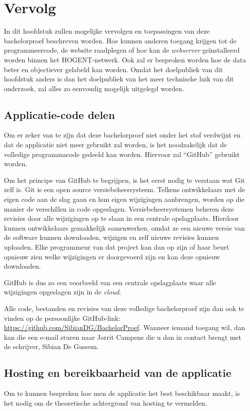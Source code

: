 \chapter{Vervolg}
\label{ch:vervolg}

In dit hoofdstuk zullen mogelijke vervolgen en toepassingen van deze bachelorproef beschreven worden. Hoe kunnen anderen toegang krijgen tot de programmeercode, de website raadplegen of hoe kan de \textit{webserver} geïnstalleerd worden binnen het HOGENT-netwerk. Ook zal er besproken worden hoe de data beter en objectiever gelabeld kan worden. Omdat het doelpubliek van dit hoofdstuk anders is dan het doelpubliek van het meer technische luik van dit onderzoek, zal alles zo eenvoudig mogelijk uitgelegd worden.

\section{Applicatie-code delen}
Om er zeker van te zijn dat deze bachelorproef niet onder het stof verdwijnt en dat de applicatie niet meer gebruikt zal worden, is het noodzakelijk dat de volledige programmacode gedeeld kan worden. Hiervoor zal ``GitHub'' gebruikt worden.

Om het principe van GitHub te begrijpen, is het eerst nodig te verstaan wat Git zelf is. Git is een open source versiebeheersysteem. Telkens ontwikkelaars met de eigen code aan de slag gaan en hun eigen wijzigingen aanbrengen, worden op die manier de verschillen in code opgeslagen. Versiebeheersystemen beheren deze revisies door alle wijzigingen op te slaan in een centrale opslagplaats. Hierdoor kunnen ontwikkelaars gemakkelijk samenwerken, omdat ze een nieuwe versie van de software kunnen downloaden, wijzigen en zelf nieuwe revisies kunnen uploaden. Elke programmeur van dat project kan dan op zijn of haar beurt opnieuw zien welke wijzigingen er doorgevoerd zijn en kan deze opnieuw downloaden.~\autocite{Brown2019}

GitHub is dus zo een voorbeeld van een centrale opslagplaats waar alle wijzigingen opgeslagen zijn in de \textit{cloud}.

Alle code, bestanden en revisies van deze volledige bachelorproef zijn dan ook te vinden op de persoonlijke GitHub-link: \url{https://github.com/SibianDG/BachelorProef}. Wanneer iemand toegang wil, dan kan die een e-mail sturen naar Jorrit Campens die u dan in contact brengt met de schrijver, Sibian De Gussem.

\section{Hosting en bereikbaarheid van de applicatie}
Om te kunnen bespreken hoe men de applicatie het best beschikbaar maakt, is het nodig om de theoretische achtergrond van hosting te vermelden.

